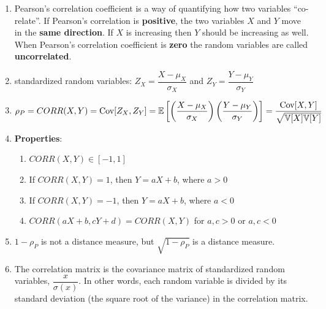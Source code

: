 \begin{enumerate}
    \item Pearson’s correlation coefficient is a way of quantifying how two variables “co-relate”.
    If Pearson’s correlation is \textbf{positive}, the two variables $X$ and $Y$ move in the \textbf{same direction}.
    If $X$ is increasing then $Y$ should be increasing as well.
    When Pearson’s correlation coefficient is \textbf{zero} the random variables are called \textbf{uncorrelated}.
    \hfill \cite{statistics/book/Statistics-for-Data-Scientists/Maurits-Kaptein}

    \item standardized random variables: $Z_X = \dfrac{X - \mu_X }{\sigma_X}$ and $Z_Y = \dfrac{Y - \mu_Y }{\sigma_Y}$
    \hfill \cite{statistics/book/Statistics-for-Data-Scientists/Maurits-Kaptein}

    \item
    $
        \rho_P
        = CORR(X, Y )
        = \text{Cov}[Z_X , Z_Y]
        = \mathbb{E}\left[\left(\dfrac{X - \mu_X }{\sigma_X}\right) \left(\dfrac{Y - \mu_Y}{ \sigma_Y}\right)\right]
        = \dfrac{\text{Cov}[X, Y]}{\sqrt{\mathbb{V}[X] \mathbb{V}[Y] }}
    $
    \hfill \cite{statistics/book/Statistics-for-Data-Scientists/Maurits-Kaptein}

    \item \textbf{Properties}:
    \begin{enumerate}
        \item $CORR(X, Y ) \in [-1, 1]$
        \hfill \cite{statistics/book/Statistics-for-Data-Scientists/Maurits-Kaptein}

        \item If $CORR(X, Y ) = 1$, then $Y = a X + b$, where $a > 0$
        \hfill \cite{statistics/book/Statistics-for-Data-Scientists/Maurits-Kaptein}

        \item If $CORR(X, Y ) = -1$, then $Y = a X + b$, where $a < 0$
        \hfill \cite{statistics/book/Statistics-for-Data-Scientists/Maurits-Kaptein}

        \item $CORR(a X + b, cY + d) = CORR(X, Y )$ for $a, c > 0$ or $a, c < 0$
        \hfill \cite{statistics/book/Statistics-for-Data-Scientists/Maurits-Kaptein}
    \end{enumerate}

    \item $1 - \rho_P$ is not a distance measure, but $\sqrt{1 - \rho_P}$ is a distance measure.
    \hfill \cite{statistics/book/Statistics-for-Data-Scientists/Maurits-Kaptein}

    \item The correlation matrix is the covariance matrix of standardized random variables, $\dfrac{x}{\sigma(x)}$. 
    In other words, each random variable is divided by its standard deviation (the square root of the variance) in the correlation matrix.
    \hfill \cite{mfml/book/mml/Deisenroth-Faisal-Ong}

    
\end{enumerate}

